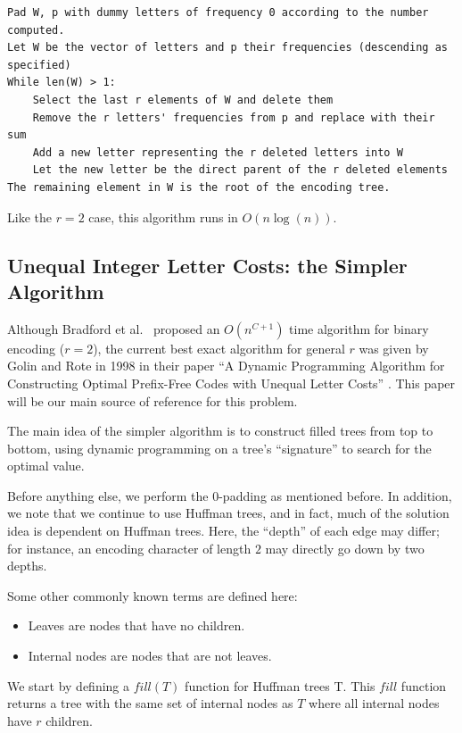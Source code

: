 \documentclass[a4paper,10pt,english]{scrartcl}
\begin{document}
\begin{verbatim}
Pad W, p with dummy letters of frequency 0 according to the number computed.
Let W be the vector of letters and p their frequencies (descending as specified)
While len(W) > 1:
    Select the last r elements of W and delete them
    Remove the r letters' frequencies from p and replace with their sum
    Add a new letter representing the r deleted letters into W
    Let the new letter be the direct parent of the r deleted elements
The remaining element in W is the root of the encoding tree.
\end{verbatim}

Like the $r = 2$ case, this algorithm runs in $O(n\log(n))$.

\subsection{Unequal Integer Letter Costs: the Simpler Algorithm}\label{sec:simple}

Although Bradford et al.\ \cite{Bradford2002} proposed an $O(n^{C+1})$ time algorithm for binary encoding ($r = 2$), the current best exact algorithm for general $r$ was given by Golin and Rote in 1998 in their paper ``A Dynamic Programming Algorithm for Constructing Optimal Prefix-Free Codes with Unequal Letter Costs'' \cite{GolinRote1998}. This paper will be our main source of reference for this problem. 

The main idea of the simpler algorithm is to construct filled trees from top to bottom, using dynamic programming on a tree's ``signature'' to search for the optimal value. 

Before anything else, we perform the 0-padding as mentioned before. In addition, we note that we continue to use Huffman trees, and in fact, much of the solution idea is dependent on Huffman trees. Here, the ``depth'' of each edge may differ; for instance, an encoding character of length $2$ may directly go down by two depths.

Some other commonly known terms are defined here:
\begin{itemize}
    \item Leaves are nodes that have no children.
    \item Internal nodes are nodes that are not leaves.
\end{itemize}

We start by defining a $fill(T)$ function for Huffman trees T. This $fill$ function returns a tree with the same set of internal nodes as $T$ where all internal nodes have $r$ children. 
\end{document}
